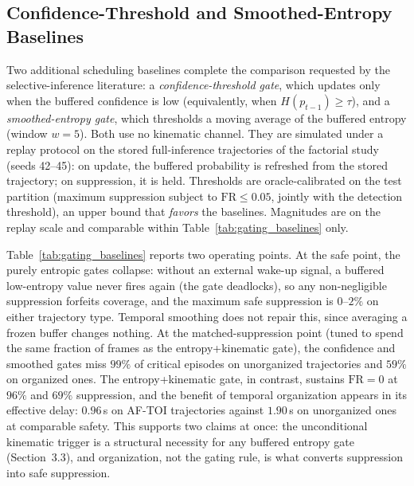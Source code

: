 \documentclass[a4paper,fleqn]{cas-dc}
\begin{document}
{\color{\revcolor}
\subsection{Confidence-Threshold and Smoothed-Entropy Baselines}
\label{sec:gating_baselines}
Two additional scheduling baselines complete the comparison requested by the
selective-inference literature: a \emph{confidence-threshold gate}, which
updates only when the buffered confidence is low (equivalently, when
$H(p_{t-1}) \ge \tau$), and a \emph{smoothed-entropy gate}, which thresholds a
moving average of the buffered entropy (window $w{=}5$). Both use no kinematic
channel. They are simulated under a replay protocol on the stored
full-inference trajectories of the factorial study (seeds 42--45): on update,
the buffered probability is refreshed from the stored trajectory; on
suppression, it is held. Thresholds are oracle-calibrated on the test
partition (maximum suppression subject to $\mathrm{FR} \le 0.05$, jointly with
the detection threshold), an upper bound that \emph{favors} the baselines.
Magnitudes are on the replay scale and comparable within
Table~\ref{tab:gating_baselines} only.

Table~\ref{tab:gating_baselines} reports two operating points. At the safe
point, the purely entropic gates collapse: without an external wake-up signal,
a buffered low-entropy value never fires again (the gate deadlocks), so any
non-negligible suppression forfeits coverage, and the maximum safe suppression
is $0$--$2\%$ on either trajectory type. Temporal smoothing does not repair
this, since averaging a frozen buffer changes nothing. At the
matched-suppression point (tuned to spend the same fraction of frames as the
entropy+kinematic gate), the confidence and smoothed gates miss
$99\%$ of critical episodes on unorganized trajectories and $59\%$ on
organized ones. The entropy+kinematic gate, in contrast, sustains
$\mathrm{FR}=0$ at $96\%$ and $69\%$ suppression, and the benefit of temporal
organization appears in its effective delay: $0.96$\,s on \mbox{AF-TOI}
trajectories against $1.90$\,s on unorganized ones at comparable safety. This
supports two claims at once: the unconditional kinematic trigger is a
structural necessity for any buffered entropy gate (Section~3.3), and
organization, not the gating rule, is what converts suppression into safe
suppression.

}
\end{document}

